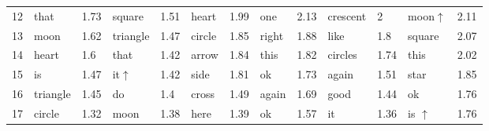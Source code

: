 \begin{figure*}
{{\begin{tabular*}{0.9\textwidth}{@{\extracolsep{\fill}}lllllllllllll}
        12 & \hspace{1ex}that & 1.73 & \hspace{1ex}square & 1.51 & \hspace{1ex}heart & 1.99 & \hspace{1ex}one & 2.13 & \hspace{1ex}crescent & 2 & \hspace{1ex}moon\hspace{0.5ex}$\bm{\uparrow}$ & 2.11\\
        13 & \hspace{1ex}moon & 1.62 & \hspace{1ex}triangle & 1.47 & \hspace{1ex}circle & 1.85 & \hspace{1ex}right & 1.88 & \hspace{1ex}like & 1.8 & \hspace{1ex}square & 2.07\\
        14 & \hspace{1ex}heart & 1.6 & \hspace{1ex}that & 1.42 & \hspace{1ex}arrow & 1.84 & \hspace{1ex}this & 1.82 & \hspace{1ex}circles & 1.74 & \hspace{1ex}this & 2.02\\
        15 & \hspace{1ex}is & 1.47 & \hspace{1ex}it\hspace{4.5ex}$\bm{\uparrow}$ & 1.42 & \hspace{1ex}side & 1.81 & \hspace{1ex}ok & 1.73 & \hspace{1ex}again & 1.51 & \hspace{1ex}star & 1.85\\
        16 & \hspace{1ex}triangle & 1.45 & \hspace{1ex}do & 1.4 & \hspace{1ex}cross & 1.49 & \hspace{1ex}again & 1.69 & \hspace{1ex}good & 1.44 & \hspace{1ex}ok & 1.76\\
        17 & \hspace{1ex}circle & 1.32 & \hspace{1ex}moon & 1.38 & \hspace{1ex}here & 1.39 & \hspace{1ex}ok & 1.57 & \hspace{1ex}it & 1.36 & \hspace{1ex}is \hspace{3.5ex}$\bm{\uparrow}$ & 1.76\\

\end{tabular*}}}
\end{figure*}

